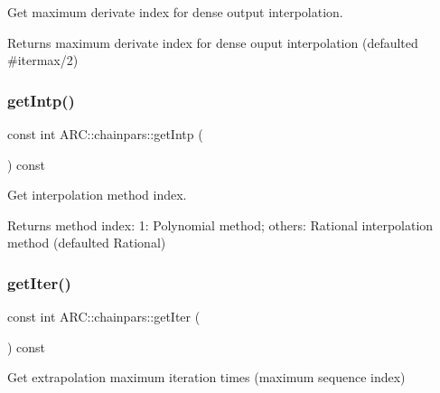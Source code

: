 Get maximum derivate index for dense output interpolation. 

\begin{DoxyReturn}{Returns}
maximum derivate index for dense ouput interpolation (defaulted \#itermax/2) 
\end{DoxyReturn}
\hypertarget{classARC_1_1chainpars_aad612e3c643bdd642245397d7dc57d94}{}\label{classARC_1_1chainpars_aad612e3c643bdd642245397d7dc57d94} 
\subsubsection{\texorpdfstring{get\+Intp()}{getIntp()}}
{\footnotesize\ttfamily const int A\+R\+C\+::chainpars\+::get\+Intp (\begin{DoxyParamCaption}{ }\end{DoxyParamCaption}) const\hspace{0.3cm}{\ttfamily [inline]}}



Get interpolation method index. 

\begin{DoxyReturn}{Returns}
method index\+: 1\+: Polynomial method; others\+: Rational interpolation method (defaulted Rational) 
\end{DoxyReturn}
\hypertarget{classARC_1_1chainpars_a000356820943c99de5542b04130f453f}{}\label{classARC_1_1chainpars_a000356820943c99de5542b04130f453f} 
\subsubsection{\texorpdfstring{get\+Iter()}{getIter()}}
{\footnotesize\ttfamily const int A\+R\+C\+::chainpars\+::get\+Iter (\begin{DoxyParamCaption}{ }\end{DoxyParamCaption}) const\hspace{0.3cm}{\ttfamily [inline]}}



Get extrapolation maximum iteration times (maximum sequence index) 

\hypertarget{classARC_1_1chainpars_aea815f20c4efe8e93d68153e41275770}{}\label{classARC_1_1chainpars_aea815f20c4efe8e93d68153e41275770} 
